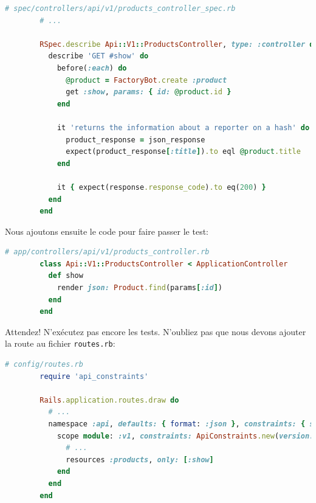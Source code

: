 \documentclass[]{report}
\begin{document}
      \begin{scriptsize}
        \begin{lstlisting}[language=ruby, caption={Test d'affichage d'un produit}, label={lst:products_controller_spec_show}]
        # spec/controllers/api/v1/products_controller_spec.rb
        # ...

        RSpec.describe Api::V1::ProductsController, type: :controller do
          describe 'GET #show' do
            before(:each) do
              @product = FactoryBot.create :product
              get :show, params: { id: @product.id }
            end

            it 'returns the information about a reporter on a hash' do
              product_response = json_response
              expect(product_response[:title]).to eql @product.title
            end

            it { expect(response.response_code).to eq(200) }
          end
        end
        \end{lstlisting}
      \end{scriptsize}

      Nous ajoutons ensuite le code pour faire passer le test:

      \begin{scriptsize}
        \begin{lstlisting}[language=ruby]
        # app/controllers/api/v1/products_controller.rb
        class Api::V1::ProductsController < ApplicationController
          def show
            render json: Product.find(params[:id])
          end
        end
        \end{lstlisting}
      \end{scriptsize}

      Attendez! N'exécutez pas encore les tests. N'oubliez pas que nous devons ajouter la route au fichier \verb|routes.rb|:

      \begin{scriptsize}
        \begin{lstlisting}[language=ruby]
        # config/routes.rb
        require 'api_constraints'

        Rails.application.routes.draw do
          # ...
          namespace :api, defaults: { format: :json }, constraints: { subdomain: 'api' }, path: '/' do
            scope module: :v1, constraints: ApiConstraints.new(version: 1, default: true) do
              # ...
              resources :products, only: [:show]
            end
          end
        end
        \end{lstlisting}
      \end{scriptsize}
\end{document}
